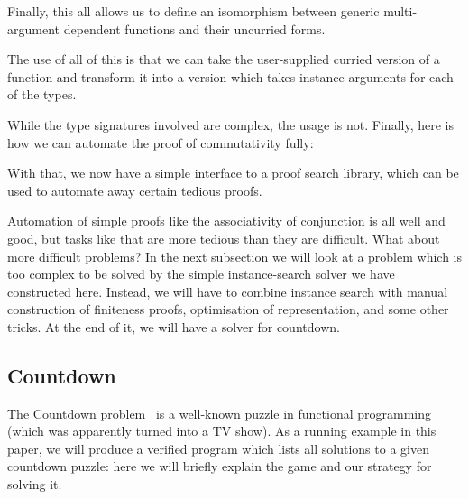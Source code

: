 Finally, this all allows us to define an isomorphism between generic
multi-argument dependent functions and their uncurried forms.
\begin{agdalisting*}
\end{agdalisting*}

The use of all of this is that we can take the user-supplied curried version of
a function and transform it into a version which takes instance arguments for
each of the types.
\begin{agdalisting*}
\end{agdalisting*}
\begin{agdalisting*}
\end{agdalisting*}
While the type signatures involved are complex, the usage is not.
Finally, here is how we can automate the proof of commutativity fully:
\begin{agdalisting*}
\end{agdalisting*}

With that, we now have a simple interface to a proof search library, which can
be used to automate away certain tedious proofs.

Automation of simple proofs like the associativity of conjunction is all well
and good, but tasks like that are more tedious than they are difficult.
What about more difficult problems?
In the next subsection we will look at a problem which is too complex to be solved
by the simple instance-search solver we have constructed here.
Instead, we will have to combine instance search with manual construction of
finiteness proofs, optimisation of representation, and some other tricks.
At the end of it, we will have a solver for countdown.
\pagebreak
\subsection{Countdown}

The Countdown problem~\citep{huttonCountdownProblem2002} is a well-known puzzle
in functional programming (which was apparently turned into a TV show).
As a running example in this paper, we will produce a verified program which
lists all solutions to a given countdown puzzle: here we will briefly explain
the game and our strategy for solving it.

